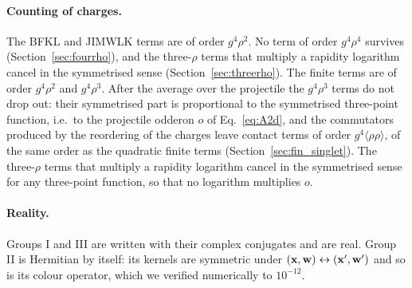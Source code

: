 \paragraph{Counting of charges.} The BFKL and JIMWLK terms are of order $g^4\rho^2$. No term of order $g^4\rho^4$ survives (Section~\ref{sec:fourrho}), and the three-$\rho$ terms that multiply a rapidity logarithm cancel in the symmetrised sense (Section~\ref{sec:threerho}). The finite terms are of order $g^4\rho^2$ and $g^4\rho^3$. After the average over the projectile the $g^4\rho^3$ terms do not drop out: their symmetrised part is proportional to the symmetrised three-point function, i.e.\ to the projectile odderon $o$ of Eq.~\eqref{eq:A2d}, and the commutators produced by the reordering of the charges leave contact terms of order $g^4\langle\rho\rho\rangle$, of the same order as the quadratic finite terms (Section~\ref{sec:fin_singlet}). The three-$\rho$ terms that multiply a rapidity logarithm cancel in the symmetrised sense for any three-point function, so that no logarithm multiplies $o$.

\paragraph{Reality.} Groups I and III are written with their complex conjugates and are real. Group II is Hermitian by itself: its kernels are symmetric under $(\mathbf{x},\mathbf{w})\leftrightarrow(\mathbf{x}',\mathbf{w}')$ and so is its colour operator, which we verified numerically to $10^{-12}$.

